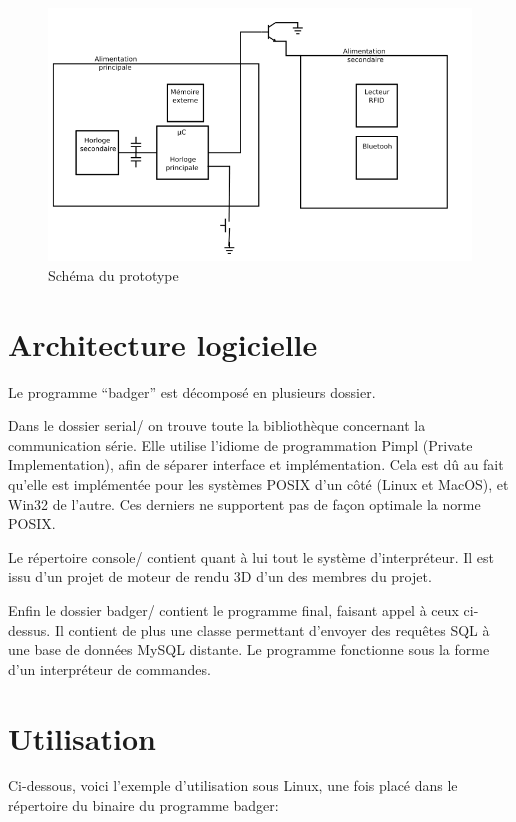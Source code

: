     \begin{figure}[h]
        \begin{center}
            \includegraphics[scale=0.7]{images/protoSchema.png} 
        \end{center}
        \caption{Schéma du prototype}
        \label{Schéma du prototype}
     \end{figure} 


    \section{Architecture logicielle}
Le programme ``badger'' est décomposé en plusieurs dossier. 

Dans le dossier serial/ on trouve toute la bibliothèque concernant la communication
série. Elle utilise l'idiome de programmation Pimpl (Private Implementation), afin 
de séparer interface et implémentation. Cela est dû au fait qu'elle est implémentée
pour les systèmes POSIX d'un côté (Linux et MacOS), et Win32 de l'autre. Ces derniers
ne supportent pas de façon optimale la norme POSIX.

Le répertoire console/ contient quant à lui tout le système d'interpréteur.
Il est issu d'un projet de moteur de rendu 3D d'un des membres du projet.

Enfin le dossier badger/ contient le programme final, faisant appel à ceux
ci-dessus. Il contient de plus une classe permettant d'envoyer des requêtes SQL
à une base de données MySQL distante. Le programme fonctionne sous la forme d'un 
interpréteur de commandes.
\newpage

    \section{Utilisation}
Ci-dessous, voici l'exemple d'utilisation sous Linux, une fois placé dans le
répertoire du binaire du programme badger:

